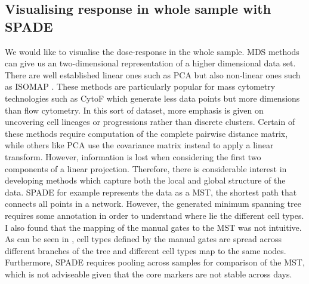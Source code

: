 \subsection{Visualising response in whole sample with SPADE}

We would like to visualise the dose-response in the whole sample.  
\Gls{MDS} methods can give us an two-dimensional representation of a higher dimensional data set.
There are well established linear ones such as \gls{PCA} but also non-linear ones such as \gls{ISOMAP} \citep{Tenenbaum:2000jp}.
These methods are particularly popular for mass cytometry technologies such as CytoF which generate less data points but more dimensions than flow cytometry.
In this sort of dataset, more emphasis is given on uncovering cell lineages or progressions rather than discrete clusters.
Certain of these methods require computation of the complete pairwise distance matrix,
while others like PCA use the covariance matrix instead to apply a linear transform.
However, information is lost when considering the first two components of a linear projection.
Therefore, there is considerable interest in developing methods which capture both the local and global structure of the data.
SPADE for example represents the data as a \gls{MST}, the shortest path that connects all points in a network.
However, the generated minimum spanning tree requires some annotation in order to understand where lie the different cell types.
I also found that the mapping of the manual gates to the MST was not intuitive.
As can be seen in , cell types defined by the manual gates are spread across different branches of the tree
and different cell types map to the same nodes.
Furthermore, SPADE requires pooling across samples for comparison of the \gls{MST}, which is not adviseable given that the core
markers are not stable across days.

